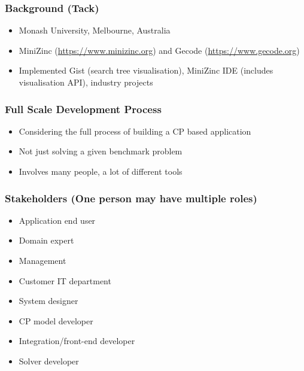 \begin{frame}
\frametitle{Background (Tack)}
\begin{itemize}
    \item Monash University, Melbourne, Australia
    \item MiniZinc (\url{https://www.minizinc.org}) and Gecode (\url{https://www.gecode.org})
    \item Implemented Gist (search tree visualisation), MiniZinc IDE (includes visualisation API), industry projects
\end{itemize}
\end{frame}

\begin{frame}
\frametitle{Full Scale Development Process}
\begin{itemize}
\item Considering the full process of building a CP based application
\item Not just solving a given benchmark problem
\item Involves many people, a lot of different tools
\end{itemize}
\end{frame}

\begin{frame}
\frametitle{Stakeholders (One person may have multiple roles)}
\begin{itemize}
\item Application end user
\item Domain expert
\item Management
\item Customer IT department
\item System designer
\item CP model developer
\item Integration/front-end developer
\item Solver developer
\end{itemize}
\end{frame}

